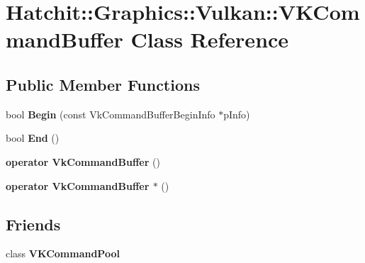 \hypertarget{classHatchit_1_1Graphics_1_1Vulkan_1_1VKCommandBuffer}{}\section{Hatchit\+:\+:Graphics\+:\+:Vulkan\+:\+:V\+K\+Command\+Buffer Class Reference}
\label{classHatchit_1_1Graphics_1_1Vulkan_1_1VKCommandBuffer}
\subsection*{Public Member Functions}
\begin{DoxyCompactItemize}
\item 
bool {\bfseries Begin} (const Vk\+Command\+Buffer\+Begin\+Info $\ast$p\+Info)\hypertarget{classHatchit_1_1Graphics_1_1Vulkan_1_1VKCommandBuffer_a956c9a450b65ccaf5fc3d9587b062242}{}\label{classHatchit_1_1Graphics_1_1Vulkan_1_1VKCommandBuffer_a956c9a450b65ccaf5fc3d9587b062242}

\item 
bool {\bfseries End} ()\hypertarget{classHatchit_1_1Graphics_1_1Vulkan_1_1VKCommandBuffer_ab95580c017215b2ffb25164fa882aa53}{}\label{classHatchit_1_1Graphics_1_1Vulkan_1_1VKCommandBuffer_ab95580c017215b2ffb25164fa882aa53}

\item 
{\bfseries operator Vk\+Command\+Buffer} ()\hypertarget{classHatchit_1_1Graphics_1_1Vulkan_1_1VKCommandBuffer_aae3dd8c42be1656f4ffb71dbd8ebd2e0}{}\label{classHatchit_1_1Graphics_1_1Vulkan_1_1VKCommandBuffer_aae3dd8c42be1656f4ffb71dbd8ebd2e0}

\item 
{\bfseries operator Vk\+Command\+Buffer $\ast$} ()\hypertarget{classHatchit_1_1Graphics_1_1Vulkan_1_1VKCommandBuffer_add0361d1a871d5d867e292610e049498}{}\label{classHatchit_1_1Graphics_1_1Vulkan_1_1VKCommandBuffer_add0361d1a871d5d867e292610e049498}

\end{DoxyCompactItemize}
\subsection*{Friends}
\begin{DoxyCompactItemize}
\item 
class {\bfseries V\+K\+Command\+Pool}\hypertarget{classHatchit_1_1Graphics_1_1Vulkan_1_1VKCommandBuffer_ae36c5da93d8f0f084961c43ad6e53f8a}{}\label{classHatchit_1_1Graphics_1_1Vulkan_1_1VKCommandBuffer_ae36c5da93d8f0f084961c43ad6e53f8a}

\end{DoxyCompactItemize}


